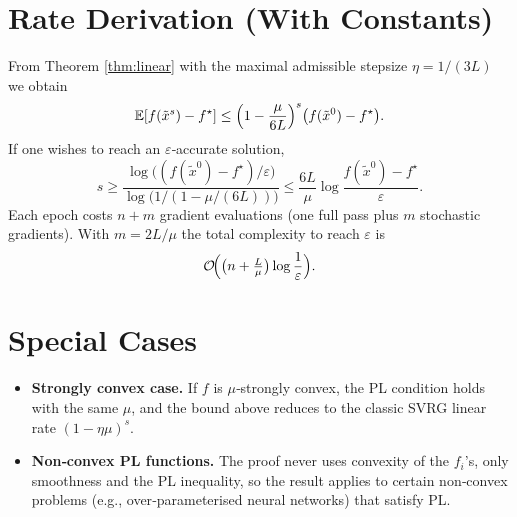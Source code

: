 \documentclass{article}
\begin{document}
\section*{Rate Derivation (With Constants)}
From Theorem \ref{thm:linear} with the maximal admissible stepsize $\eta=1/(3L)$ we obtain
\[
\mathbb{E}[f(\tilde{x}^{s})-f^{\star}]
\le \Bigl(1-\frac{\mu}{6L}\Bigr)^{s}\bigl(f(\tilde{x}^{0})-f^{\star}\bigr).
\]
If one wishes to reach an $\varepsilon$‑accurate solution,
\[
s\ge \frac{\log\bigl((f(\tilde{x}^{0})-f^{\star})/\varepsilon\bigr)}
            {\log\bigl(1/(1-\mu/(6L))\bigr)}
   \le \frac{6L}{\mu}\log\frac{f(\tilde{x}^{0})-f^{\star}}{\varepsilon}.
\]
Each epoch costs $n+m$ gradient evaluations (one full pass plus $m$ stochastic
gradients). With $m=2L/\mu$ the total complexity to reach $\varepsilon$ is
\[
\mathcal{O}\!\Bigl(\bigl(n+\tfrac{L}{\mu}\bigr)\log\frac{1}{\varepsilon}\Bigr).
\]

\section*{Special Cases}
\begin{itemize}
    \item \textbf{Strongly convex case.} If $f$ is $\mu$‑strongly convex, the PL
          condition holds with the same $\mu$, and the bound above reduces to the
          classic SVRG linear rate $ (1-\eta\mu)^{s}$.
    \item \textbf{Non‑convex PL functions.} The proof never uses convexity of the $f_i$'s,
          only smoothness and the PL inequality, so the result applies to certain
          non‑convex problems (e.g., over‑parameterised neural networks) that satisfy PL.
\end{itemize}

\end{document}
